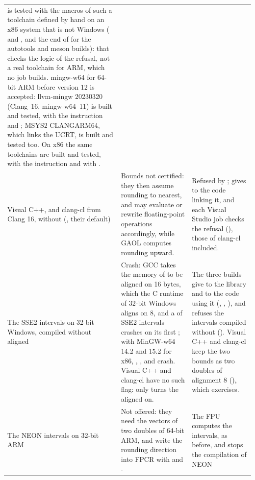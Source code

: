 \begin{longtable}{L{2.9cm}L{5.8cm}L{5cm}}
    is tested with the macros of such a toolchain defined by hand on an x86
    system that is not Windows ( and
    , and the end of
     for the autotools and meson builds): that checks
    the logic of the refusal, not a real toolchain for ARM, which no job
    builds. mingw-w64 for 64-bit ARM before version 12 is accepted:
    llvm-mingw 20230320 (Clang~16, mingw-w64~11) is built and tested, with the
    instruction and ; MSYS2 CLANGARM64, which links the
    UCRT, is built and tested too. On x86 the same toolchains are built and
    tested, with the instruction and with .\\
  Visual C++, and clang-cl from Clang 16, without 
    (, their default) & Bounds not certified: they then
    assume rounding to nearest, and may evaluate or rewrite floating-point
    operations accordingly, while GAOL computes rounding upward. & Refused
    by ;  gives
     to the code linking it, and each Visual Studio job
    checks the refusal (), those of clang-cl
    included.\\
  The SSE2 intervals on 32-bit Windows, compiled without aligned 
    & Crash: GCC takes the memory of  to be aligned on 16 bytes,
    which the C runtime of 32-bit Windows aligns on 8, and a
     of SSE2 intervals crashes on its first
    ; with MinGW-w64 14.2 and 15.2 for x86, ,
    ,  and 
    crash. Visual C++ and clang-cl have no such flag: only
     turns the aligned  on. & The three builds
    give  to the library and to the code using it
    (, , ), and
     refuses the intervals compiled without
    (). Visual C++ and clang-cl keep the two
    bounds as two doubles of alignment 8
    (), which
     exercises.\\
  The NEON intervals on 32-bit ARM & Not offered: they need the vectors of
    two doubles of 64-bit ARM, and write the rounding direction into FPCR
    with  and . & The FPU computes the intervals, as
    before, and  stops the compilation of NEON

\end{longtable}
